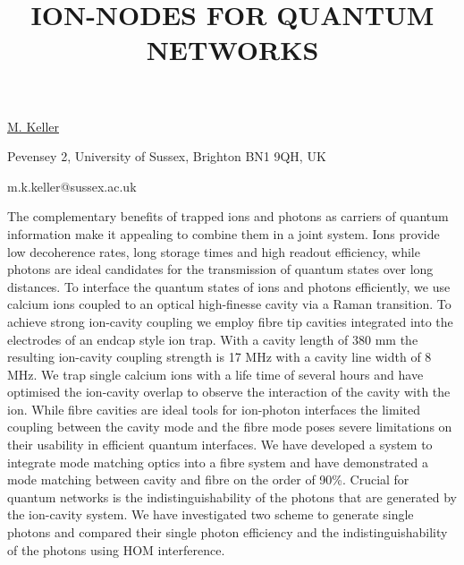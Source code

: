 \title{ION-NODES FOR QUANTUM NETWORKS}

\underline{M. Keller}  

{\normalsize{\vspace{-4mm}
Pevensey 2,
University of Sussex,
Brighton BN1 9QH,
UK



\email m.k.keller@sussex.ac.uk}}

The complementary benefits of trapped ions and photons as carriers of quantum information make it appealing to combine them in a joint system. Ions provide low decoherence rates, long storage times and high readout efficiency, while photons are ideal candidates for the transmission of quantum states over long distances. To interface the quantum states of ions and photons efficiently, we use calcium ions coupled to an optical high-finesse cavity via a Raman transition.
To achieve strong ion-cavity coupling we employ fibre tip cavities integrated into the electrodes of an endcap style ion trap. With a cavity length of 380 mm the resulting ion-cavity coupling strength is 17 MHz with a cavity line width of 8 MHz. We trap single calcium ions with a life time of several hours and have optimised the ion-cavity overlap to observe the interaction of the cavity with the ion.
While fibre cavities are ideal tools for ion-photon interfaces the limited coupling between the cavity mode and the fibre mode poses severe limitations on their usability in efficient quantum interfaces. We have developed a system to integrate mode matching optics into a fibre system and have demonstrated a mode matching between cavity and fibre on the order of 90\%.
Crucial for quantum networks is the indistinguishability of the photons that are generated by the ion-cavity system. We have investigated two scheme to generate single photons and compared their single photon efficiency and the indistinguishability of the photons using HOM interference.


\vspace{\baselineskip}
